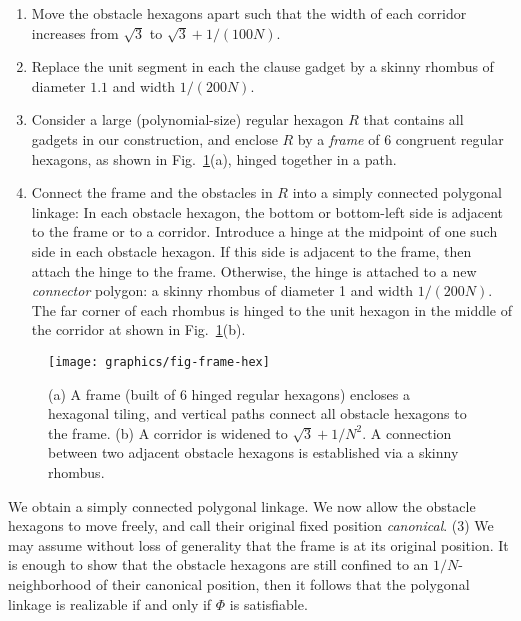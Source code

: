 \begin{enumerate}
\item Move the obstacle hexagons apart such that the width of each corridor increases from $\sqrt{3}$ to $\sqrt{3}+1/(100N)$.
\item Replace the unit segment in each the clause gadget by a skinny rhombus of diameter $1.1$ and width $1/(200N)$.
\item Consider a large (polynomial-size) regular hexagon $R$ that contains all gadgets in our construction, and enclose $R$ by a \emph{frame} of 6 congruent regular hexagons, as shown in Fig.~\ref{fig:frame}(a), hinged together in a path.
%
%
\item Connect the frame and the obstacles in $R$ into a simply connected polygonal linkage: In each obstacle hexagon, the bottom or bottom-left side is adjacent to the frame or to a corridor. Introduce a hinge at the midpoint of one such side in each obstacle hexagon. If this side is adjacent to the frame, then attach the hinge to the frame. Otherwise, the hinge is attached to a new \emph{connector} polygon: a skinny rhombus of diameter 1 and width $1/(200N)$. The far corner of each rhombus is hinged to the unit hexagon in the middle of the corridor at shown in Fig.~\ref{fig:frame}(b).
\end{enumerate}

\begin{figure}[htbp]
	\centering
	\texttt{[image: graphics/fig-frame-hex]}
	\caption{(a) A frame (built of 6 hinged regular hexagons) encloses a hexagonal tiling, and
    vertical paths connect all obstacle hexagons to the frame.
    (b) A corridor is widened to $\sqrt{3}+1/N^2$. A connection between
    two adjacent obstacle hexagons is established via a skinny rhombus.}
	\label{fig:frame}
\end{figure}
We obtain a simply connected polygonal linkage. 
We now allow the obstacle hexagons to move freely, and call their original fixed position \emph{canonical}. 
\noindent (3) We may assume without loss of generality that the frame is at its original position. 
It is enough to show that the obstacle hexagons are still confined to an $1/N$-neighborhood of their canonical position, then it
follows that the polygonal linkage is realizable if and only if $\Phi$ is satisfiable.

